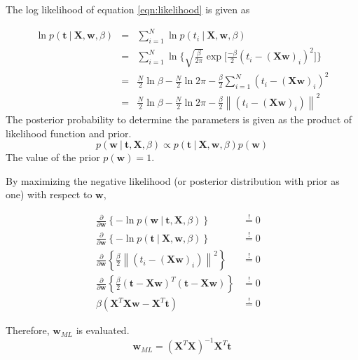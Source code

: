 \documentclass[11pt]{article}
\newcommand\given[1][]{\:#1\vert\:}
\newcommand{\norm}[1]{\left\lVert#1\right\rVert}
\begin{document}
The log likelihood of equation \ref{eqn:likelihood} is given as 

\begin{eqnarray} \label{eqn:log_likelihood}
    \ln p(\bm{t} \given \bm{X}, \bm{w}, \beta) 
    &=&
    \sum_{i=1}^N \ln p(t_i \given \bm{X}, \bm{w}, \beta) \\
    &=&
    \sum_{i=1}^N \ln{\Big\{\sqrt{\frac{\beta}{2\pi}}\exp{\Big[\frac{-\beta}{2} \left(t_i - (\bm{X}\bm{w})_i\right)^2\Big]}\Big\}} \\
    &=&
    \frac{N}{2}\ln{\beta} - \frac{N}{2}\ln{2\pi} - \frac{\beta}{2} \sum_{i=1}^N \left(t_i - (\bm{X}\bm{w})_i\right)^2 \\
    &=&
    \frac{N}{2}\ln{\beta} - \frac{N}{2}\ln{2\pi} - \frac{\beta}{2} \norm{\left(t_i - (\bm{X}\bm{w})_i\right)}^2 
\end{eqnarray}
The posterior probability to determine the parameters is given as the product of likelihood function and prior.
\begin{equation} 
    p(\bm{w} \given \bm{t}, \bm{X}, \beta) \propto p(\bm{t} \given \bm{X}, \bm{w}, \beta) p(\bm{w})
\end{equation}
The value of the prior $p(\bm{w}) = 1$. 

By maximizing the negative likelihood (or posterior distribution with prior as one) with respect to $\bm{w}$,

\begin{eqnarray}
    \frac{\partial }{\partial  \bm{w}} \left\{ -\ln{p(\bm{w} \given \bm{t}, \bm{X}, \beta)} \right\} 
    &\overset{!}{=} 0& \\
    \frac{\partial }{\partial  \bm{w}} \left\{ -\ln{p(\bm{t} \given \bm{X}, \bm{w}, \beta)} \right\} 
    &\overset{!}{=} 0& \\
    \frac{\partial }{\partial \bm{w}} \left\{\frac{\beta}{2} \norm{\left(t_i - (\bm{X}\bm{w})_i\right)}^2  \right\}
    &\overset{!}{=} 0& \\
    \frac{\partial }{\partial \bm{w}} \left\{\frac{\beta}{2} \left(\bm{t} - \bm{X}\bm{w}\right)^T \left(\bm{t} - \bm{X}\bm{w}\right) \right\}
    &\overset{!}{=} 0& \\
    \beta \left( \bm{X}^T\bm{X}\bm{w} - \bm{X}^T \bm{t} \right) 
    &\overset{!}{=} 0& 
\end{eqnarray}

Therefore, $\bm{w}_{ML}$ is evaluated.
\begin{equation} \label{eqn:w_ML}
    \bm{w}_{ML} = (\bm{X}^T \bm{X})^{-1} \bm{X}^T \bm{t}
\end{equation}
\end{document}
